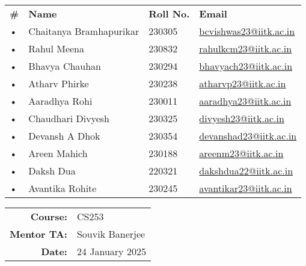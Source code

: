 \documentclass[a4paper,12pt]{article}
\begin{document}
\begin{flushright}
\begin{tabular}{@{}p{} p{} p{} p{}@{}}
    \textbf{\#} & \textbf{Name} & \textbf{Roll No.} & \textbf{Email} \\[0.5cm] %
    • & Chaitanya Bramhapurikar & 230305 & \href{mailto:bcvishwas23@iitk.ac.in}{bcvishwas23@iitk.ac.in} \\
    • & Rahul Meena & 230832 & \href{mailto:rahulkcm23@iitk.ac.in}{rahulkcm23@iitk.ac.in} \\
    • & Bhavya Chauhan & 230294 & \href{mailto:bhavyach23@iitk.ac.in}{bhavyach23@iitk.ac.in} \\
    • & Atharv Phirke & 230238 & \href{mailto:atharvp23@iitk.ac.in}{atharvp23@iitk.ac.in} \\
    • & Aaradhya Rohi & 230011 & \href{mailto:aaradhya23@iitk.ac.in}{aaradhya23@iitk.ac.in} \\
    • & Chaudhari Divyesh & 230325 & \href{mailto:divyesh23@iitk.ac.in}{divyesh23@iitk.ac.in} \\
    • & Devansh A Dhok & 230354 & \href{mailto:devanshad23@iitk.ac.in}{devanshad23@iitk.ac.in} \\
    • & Areen Mahich & 230188 & \href{mailto:areenm23@iitk.ac.in}{areenm23@iitk.ac.in} \\
    • & Daksh Dua & 220321 & \href{mailto:dakshdua22@iitk.ac.in}{dakshdua22@iitk.ac.in} \\
    • & Avantika Rohite & 230245 & \href{mailto:avantikar23@iitk.ac.in}{avantikar23@iitk.ac.in} \\
\end{tabular}
\end{flushright}



\vspace{1cm}

\begin{flushright}
\begin{tabular}{rl}
    \textbf{Course:} & CS253 \\
    \textbf{Mentor TA:} & Souvik Banerjee\\
    \textbf{Date:} & 24 January 2025
\end{tabular}
\end{flushright}

\newpage

\tableofcontents
\newpage
\end{document}
